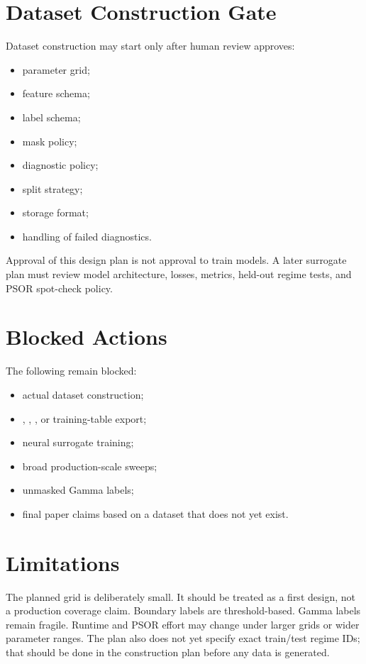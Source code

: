 \documentclass[11pt,a4paper]{article}
\newcommand{\code}[1]{\path{#1}}
\begin{document}
\section{Dataset Construction Gate}

Dataset construction may start only after human review approves:
\begin{itemize}
  \item parameter grid;
  \item feature schema;
  \item label schema;
  \item mask policy;
  \item diagnostic policy;
  \item split strategy;
  \item storage format;
  \item handling of failed diagnostics.
\end{itemize}

Approval of this design plan is not approval to train models. A later surrogate plan must review
model architecture, losses, metrics, held-out regime tests, and PSOR spot-check policy.

\section{Blocked Actions}

The following remain blocked:
\begin{itemize}
  \item actual dataset construction;
  \item \code{.npz}, \code{.npy}, \code{.pt}, or training-table export;
  \item neural surrogate training;
  \item broad production-scale sweeps;
  \item unmasked Gamma labels;
  \item final paper claims based on a dataset that does not yet exist.
\end{itemize}

\section{Limitations}

The planned grid is deliberately small. It should be treated as a first design, not a production
coverage claim. Boundary labels are threshold-based. Gamma labels remain fragile. Runtime and
PSOR effort may change under larger grids or wider parameter ranges. The plan also does not yet
specify exact train/test regime IDs; that should be done in the construction plan before any data
is generated.
\end{document}

